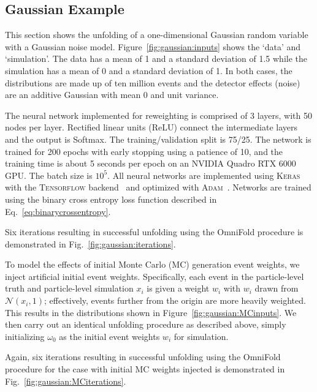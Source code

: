 \documentclass[NOTE, atlasdraft=true, texlive=2016, UKenglish]{\ATLASLATEXPATH atlasdoc}
\begin{document}
\subsection{Gaussian Example}

This section shows the unfolding of a one-dimensional Gaussian random variable with a Gaussian noise model.  Figure~\ref{fig:gaussian:inputs} shows the `data' and `simulation'.  The data has a mean of 1 and a standard deviation of 1.5 while the simulation has a mean of 0 and a standard deviation of 1.  In both cases, the distributions are made up of ten million events and the detector effects (noise) are an additive Gaussian with mean 0 and unit variance.

The neural network implemented for reweighting is comprised of 3 layers, with 50 nodes per layer.  Rectified linear units (ReLU) connect the intermediate layers and the output is Softmax.  The training/validation split is 75/25.  The network is trained for 200 epochs with early stopping using a patience of 10, and the training time is about 5 seconds per epoch on an NVIDIA Quadro RTX 6000 GPU. The batch size is $10^5$.  All neural networks are implemented using \textsc{Keras}~\cite{keras} with the \textsc{Tensorflow} backend~\cite{tensorflow} and optimized with \textsc{Adam}~\cite{adam}.  Networks are trained using the binary cross entropy loss function described in Eq.~\ref{eq:binarycrossentropy}.

Six iterations resulting in successful unfolding using the OmniFold procedure is demonstrated in Fig.~\ref{fig:gaussian:iterations}.

To model the effects of initial Monte Carlo (MC) generation event weights, we inject artificial initial event weights. Specifically, each event in the particle-level truth and particle-level simulation $x_i$ is given a weight $w_i$ with $w_i$ drawn from $\mathcal{N}(x_i, 1)$; effectively, events further from the origin are more heavily weighted. This results in the distributions shown in Figure~\ref{fig:gaussian:MCinputs}. We then carry out an identical unfolding procedure as described above, simply initializing $\omega_0$ as the initial event weights $w_i$ for simulation.

Again, six iterations resulting in successful unfolding using the OmniFold procedure for the case with initial MC weights injected is demonstrated in Fig.~\ref{fig:gaussian:MCiterations}.
\end{document}
